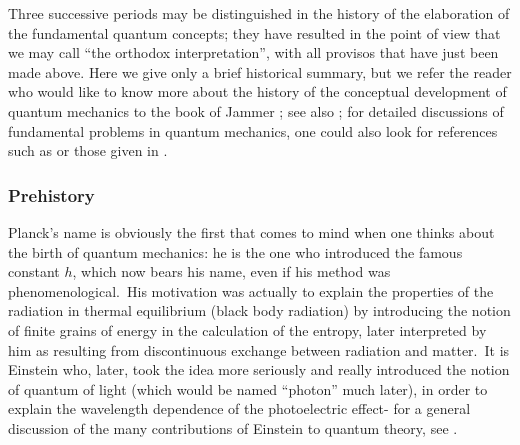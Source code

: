 \documentclass[12pt,onecolumn]{article}%
\begin{document}
Three successive periods may be distinguished in the history of the
elaboration of the fundamental quantum concepts; they have resulted in the
point of view that we may call ``the orthodox interpretation'', with all
provisos that have just been made above. Here we give only a brief historical
summary, but we refer the reader who would like to know more about the history
of the conceptual development of quantum mechanics to the book of Jammer
\cite{Jammer}; see also \cite{Darrigol-1}; for detailed discussions of
fundamental problems in quantum mechanics, one could also look for references
such as \cite{d'Espagnat} \cite{d'Espagnat-2} \cite{Shimony} or those given in
\cite{AJP-RL}.

\subsubsection{Prehistory}

Planck's name is obviously the first that comes to mind when one thinks about
the birth of quantum mechanics: he is the one who introduced the famous
constant $h$, which now bears his name, even if his method was
phenomenological.\ His motivation was actually to explain the properties of
the radiation in thermal equilibrium (black body radiation) by introducing the
notion of finite grains of energy in the calculation of the entropy, later
interpreted by him as resulting from discontinuous exchange between radiation
and matter.\ It is Einstein who, later, took the idea more seriously and
really introduced the notion of quantum of light (which would be named
``photon'' much later), in order to explain the wavelength dependence of the
photoelectric effect- for a general discussion of the many contributions of
Einstein to quantum theory, see \cite{Pais}.
\end{document}
